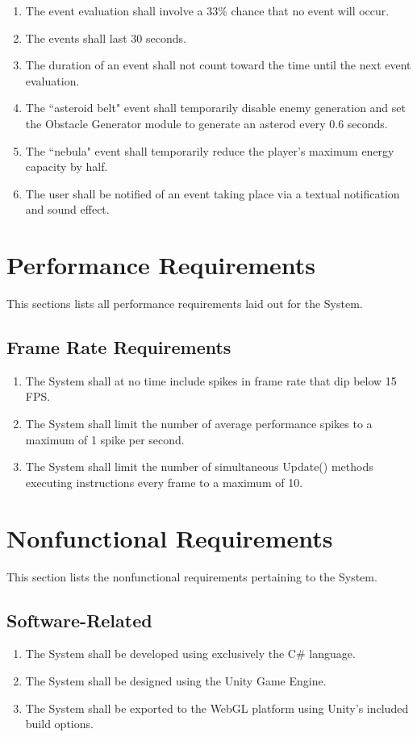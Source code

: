 \documentclass[12pt]{report}
\newenvironment{reqlist}{
	\renewcommand{\labelenumi}{\tab\thesubsection.\arabic{enumi}}
	\renewcommand{\labelenumii}{\thesubsection.\arabic{enumi}.\arabic{enumii}}
	\begin{enumerate}[itemsep = 1pt, parsep = 0pt, leftmargin = *]
}{\end{enumerate}}
\begin{document}
\begin{reqlist}
\begin{reqlist}
				\item The event evaluation shall involve a 33\% chance that no event will occur.
				\item The events shall last 30 seconds.
				\item The duration of an event shall not count toward the time until the next event evaluation.
				\item The ``asteroid belt" event shall temporarily disable enemy generation and set the Obstacle Generator module to generate an asterod every 0.6 seconds.
				\item The ``nebula" event shall temporarily reduce the player's maximum energy capacity by half.
				\item The user shall be notified of an event taking place via a textual notification and sound effect.
			\end{reqlist}
		\end{reqlist}


\section{Performance Requirements}
	This sections lists all performance requirements laid out for the System.
	\subsection{Frame Rate Requirements}
	\begin{reqlist}
		\item The System shall at no time include spikes in frame rate that dip below 15 FPS.
		\item The System shall limit the number of average performance spikes to a maximum of 1 spike per second.
		\item The System shall limit the number of simultaneous Update() methods executing instructions every frame to a maximum of 10.
	\end{reqlist}

\section{Nonfunctional Requirements}
	This section lists the nonfunctional requirements pertaining to the System. 
	\subsection{Software-Related}
		\begin{reqlist}
			\item The System shall be developed using exclusively the C\# language.
			\item The System shall be designed using the Unity Game Engine.
			\item The System shall be exported to the WebGL platform using Unity's included build options.
		\end{reqlist}
\end{document}
